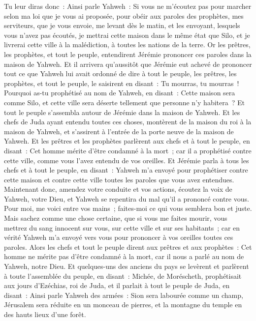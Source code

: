 \begin{multicols}{2}
Tu leur diras donc~: Ainsi parle Yahweh~: Si vous ne m'écoutez pas pour marcher selon ma loi que je vous ai proposée,
pour obéir aux paroles des prophètes, mes serviteurs, que je vous envoie, me levant dès le matin, et les envoyant, lesquels vous n'avez pas écoutés,
je mettrai cette maison dans le même état que Silo, et je livrerai cette ville à la malédiction, à toutes les nations de la terre.
Or les prêtres, les prophètes, et tout le peuple, entendirent Jérémie prononcer ces paroles dans la maison de Yahweh.
Et il arrivera qu'aussitôt que Jérémie eut achevé de prononcer tout ce que Yahweh lui avait ordonné de dire à tout le peuple, les prêtres, les prophètes, et tout le peuple, le saisirent en disant~: Tu mourras, tu mourras~!
Pourquoi as-tu prophétisé au nom de Yahweh, en disant~: Cette maison sera comme Silo, et cette ville sera déserte tellement que personne n'y habitera~? Et tout le peuple s'assembla autour de Jérémie dans la maison de Yahweh.
Et les chefs de Juda ayant entendu toutes ces choses, montèrent de la maison du roi à la maison de Yahweh, et s'assirent à l'entrée de la porte neuve de la maison de Yahweh.
Et les prêtres et les prophètes parlèrent aux chefs et à tout le peuple, en disant~: Cet homme mérite d'être condamné à la mort~; car il a prophétisé contre cette ville, comme vous l'avez entendu de vos oreilles.
Et Jérémie parla à tous les chefs et à tout le peuple, en disant~: Yahweh m'a envoyé pour prophétiser contre cette maison et contre cette ville toutes les paroles que vous avez entendues.
Maintenant donc, amendez votre conduite et vos actions, écoutez la voix de Yahweh, votre Dieu, et Yahweh se repentira du mal qu'il a prononcé contre vous.
Pour moi, me voici entre vos mains~; faites-moi ce qui vous semblera bon et juste.
Mais sachez comme une chose certaine, que si vous me faites mourir, vous mettrez du sang innocent sur vous, sur cette ville et sur ses habitants~; car en vérité Yahweh m'a envoyé vers vous pour prononcer à vos oreilles toutes ces paroles.
Alors les chefs et tout le peuple dirent aux prêtres et aux prophètes~: Cet homme ne mérite pas d'être condamné à la mort, car il nous a parlé au nom de Yahweh, notre Dieu.
Et quelques-uns des anciens du pays se levèrent et parlèrent à toute l'assemblée du peuple, en disant~:
Michée, de Moréscheth, prophétisait aux jours d'Ezéchias, roi de Juda, et il parlait à tout le peuple de Juda, en disant~: Ainsi parle Yahweh des armées~: Sion sera labourée comme un champ, Jérusalem sera réduite en un monceau de pierres, et la montagne du temple en des hauts lieux d'une forêt.

\end{multicols}
